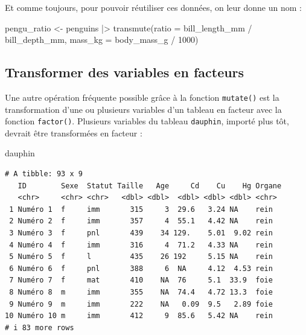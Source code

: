 \documentclass[
  a4paper,
  DIV=11,
  numbers=noendperiod,
  oneside]{scrreprt}
\newenvironment{Shaded}{}{}
\newcommand{\AttributeTok}[1]{\textcolor[rgb]{0.84,0.23,0.29}{#1}}
\newcommand{\DecValTok}[1]{\textcolor[rgb]{0.00,0.36,0.77}{#1}}
\newcommand{\FunctionTok}[1]{\textcolor[rgb]{0.44,0.26,0.76}{#1}}
\newcommand{\NormalTok}[1]{\textcolor[rgb]{0.14,0.16,0.18}{#1}}
\newcommand{\OtherTok}[1]{\textcolor[rgb]{0.44,0.26,0.76}{#1}}
\newcommand{\SpecialCharTok}[1]{\textcolor[rgb]{0.00,0.36,0.77}{#1}}
\begin{document}
Et comme toujours, pour pouvoir réutiliser ces données, on leur donne un
nom :

\begin{Shaded}
\begin{Highlighting}[]
\NormalTok{pengu\_ratio }\OtherTok{\textless{}{-}}\NormalTok{  penguins }\SpecialCharTok{|\textgreater{}}
  \FunctionTok{transmute}\NormalTok{(}\AttributeTok{ratio =}\NormalTok{ bill\_length\_mm }\SpecialCharTok{/}\NormalTok{ bill\_depth\_mm,}
            \AttributeTok{mass\_kg =}\NormalTok{ body\_mass\_g }\SpecialCharTok{/} \DecValTok{1000}\NormalTok{)}
\end{Highlighting}
\end{Shaded}

\subsection{Transformer des variables en
facteurs}\label{transformer-des-variables-en-facteurs}

Une autre opération fréquente possible grâce à la fonction
\texttt{mutate()} est la transformation d'une ou plusieurs variables
d'un tableau en facteur avec la fonction \texttt{factor()}. Plusieurs
variables du tableau \texttt{dauphin}, importé plus tôt, devrait être
transformées en facteur :

\begin{Shaded}
\begin{Highlighting}[]
\NormalTok{dauphin}
\end{Highlighting}
\end{Shaded}

\begin{verbatim}
# A tibble: 93 x 9
   ID        Sexe  Statut Taille   Age     Cd    Cu    Hg Organe
   <chr>     <chr> <chr>   <dbl> <dbl>  <dbl> <dbl> <dbl> <chr> 
 1 Numéro 1  f     imm       315     3  29.6   3.24 NA    rein  
 2 Numéro 2  f     imm       357     4  55.1   4.42 NA    rein  
 3 Numéro 3  f     pnl       439    34 129.    5.01  9.02 rein  
 4 Numéro 4  f     imm       316     4  71.2   4.33 NA    rein  
 5 Numéro 5  f     l         435    26 192     5.15 NA    rein  
 6 Numéro 6  f     pnl       388     6  NA     4.12  4.53 rein  
 7 Numéro 7  f     mat       410    NA  76     5.1  33.9  foie  
 8 Numéro 8  m     imm       355    NA  74.4   4.72 13.3  foie  
 9 Numéro 9  m     imm       222    NA   0.09  9.5   2.89 foie  
10 Numéro 10 m     imm       412     9  85.6   5.42 NA    rein  
# i 83 more rows
\end{verbatim}
\end{document}
